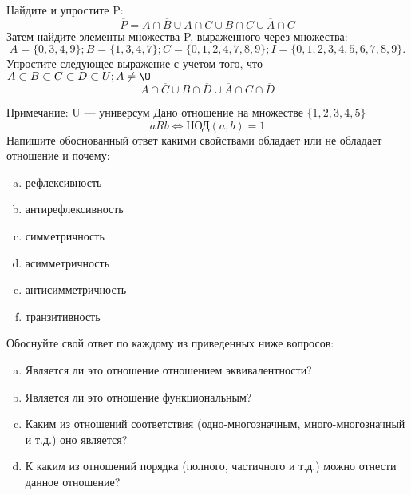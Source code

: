 \documentclass[10pt]{exam}
\begin{document}
\begin{questions}
\question
Найдите и упростите P:
\begin{equation*}
\overline{P} = A \cap \overline{B} \cup A \cap C \cup B \cap C \cup \overline{A} \cap C
\end{equation*}
Затем найдите элементы множества P, выраженного через множества:
\begin{equation*}
A = \{0, 3, 4, 9\}; 
B = \{1, 3, 4, 7\};
C = \{0, 1, 2, 4, 7, 8, 9\};
I = \{0, 1, 2, 3, 4, 5, 6, 7, 8, 9\}.
\end{equation*}\question
Упростите следующее выражение с учетом того, что $A\subset B \subset C \subset D \subset U; A \neq \O$
\begin{equation*}
A \cap  \overline{C} \cup B \cap \overline{D} \cup  \overline{A} \cap C \cap  \overline{D}
\end{equation*}

Примечание: U — универсум\question
Дано отношение на множестве $\{1, 2, 3, 4, 5\}$ 
\begin{equation*}
aRb \iff  \text{НОД}(a,b) =1
\end{equation*}
Напишите обоснованный ответ какими свойствами обладает или не обладает отношение и почему:   
\begin{enumerate} [a)]\setcounter{enumi}{0}
\item рефлексивность
\item антирефлексивность
\item симметричность
\item асимметричность
\item антисимметричность
\item транзитивность
\end{enumerate}

Обоснуйте свой ответ по каждому из приведенных ниже вопросов:
\begin{enumerate} [a)]\setcounter{enumi}{0}
    \item Является ли это отношение отношением эквивалентности?
    \item Является ли это отношение функциональным?
    \item Каким из отношений соответствия (одно-многозначным, много-многозначный и т.д.) оно является?
    \item К каким из отношений порядка (полного, частичного и т.д.) можно отнести данное отношение?
\end{enumerate}



\end{questions}
\end{document}
